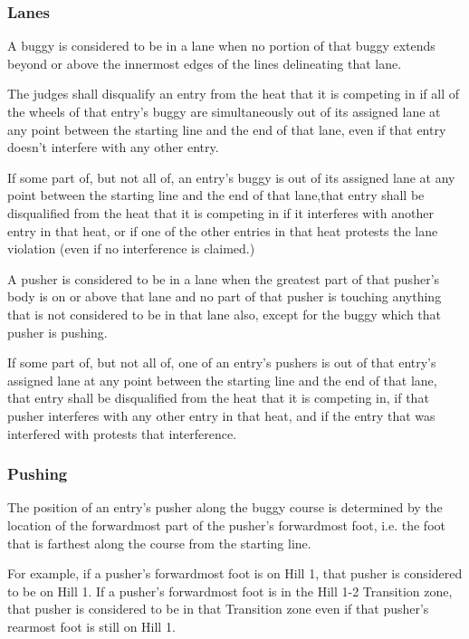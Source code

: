 \subsubsection{Lanes}

	A buggy is considered to be in a lane when no portion of that buggy extends
	beyond or above the innermost edges of the lines delineating that lane.

	The judges shall disqualify an entry from the heat that it is competing in if
	all of the wheels of that entry's buggy are simultaneously out of its assigned
	lane at any point between the starting line and the end of that lane, even if
	that entry doesn't interfere with any other entry.

	If some part of, but not all of, an entry's buggy is out of its assigned lane
	at any point between the starting line and the end of that lane,that entry
	shall be disqualified from the heat that it is competing in if it interferes
	with another entry in that heat, or if one of the other entries in that heat
	protests the lane violation (even if no interference is claimed.)

	A pusher is considered to be in a lane when the greatest part of that pusher's
	body is on or above that lane and no part of that pusher is touching anything
	that is not considered to be in that lane also, except for the buggy which that
	pusher is pushing.

	If some part of, but not all of, one of an entry's pushers is out of that
	entry's assigned lane at any point between the starting line and the end of
	that lane, that entry shall be disqualified from the heat that it is competing
	in, if that pusher interferes with any other entry in that heat, and if the
	entry that was interfered with protests that interference.

\subsubsection{Pushing}

	The position of an entry's pusher along the buggy course is determined by the
	location of the forwardmost part of the pusher's forwardmost foot, i.e. the
	foot that is farthest along the course from the starting line.

	For example, if a pusher's forwardmost foot is on Hill 1, that pusher is
	considered to be on Hill 1. If a pusher's forwardmost foot is in the Hill 1-2
	Transition zone, that pusher is considered to be in that Transition zone even
	if that pusher's rearmost foot is still on Hill 1.

